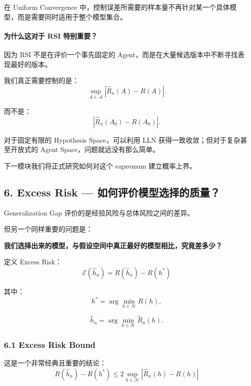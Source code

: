 在 Uniform Convergence 中，控制误差所需要的样本量不再针对某一个具体模型，而是需要同时适用于整个模型集合。

\hypertarget{part-2-12-0001-ux4e3aux4ec0ux4e48ux8fd9ux5bf9ux4e8e-rsi-ux7279ux522bux91cdux8981}{%
\paragraph{为什么这对于 RSI 特别重要？}\label{part-2-12-0001-ux4e3aux4ec0ux4e48ux8fd9ux5bf9ux4e8e-rsi-ux7279ux522bux91cdux8981}}

因为 RSI 不是在评价一个事先固定的 Agent，而是在大量候选版本中不断寻找表现最好的版本。

我们真正需要控制的是：
\[\sup_{A\in\mathcal A}
|\widehat R_n(A)-R(A)|.\]

而不是：
\[|\widehat R_n(A_0)-R(A_0)|.\]

对于固定有限的 Hypothesis Space，可以利用 LLN 获得一致收敛；但对于复杂甚至开放式的 Agent Space，问题就远没有那么简单。

下一模块我们将正式研究如何对这个 supremum 建立概率上界。

\hypertarget{part-2-12-0001-excess-risk-ux5982ux4f55ux8bc4ux4ef7ux6a21ux578bux9009ux62e9ux7684ux8d28ux91cf}{%
\subsection{6. Excess Risk --- 如何评价模型选择的质量？}\label{part-2-12-0001-excess-risk-ux5982ux4f55ux8bc4ux4ef7ux6a21ux578bux9009ux62e9ux7684ux8d28ux91cf}}

Generalization Gap 评价的是经验风险与总体风险之间的差异。

但另一个同样重要的问题是：

\textbf{我们选择出来的模型，与假设空间中真正最好的模型相比，究竟差多少？}

定义 Excess Risk：
\[\boxed{
\mathcal E(\hat h_n)
=
R(\hat h_n)-R(h^*)
}\]

其中：
\[h^*=\arg\min_{h\in\mathcal H}R(h),\]

\[\hat h_n=\arg\min_{h\in\mathcal H}\widehat R_n(h).\]

\hypertarget{part-2-12-0001-excess-risk-bound}{%
\subsubsection{6.1 Excess Risk Bound}\label{part-2-12-0001-excess-risk-bound}}

这是一个非常经典且重要的结论：
\[\boxed{
R(\hat h_n)-R(h^*)
\leq
2\sup_{h\in\mathcal H}
|\widehat R_n(h)-R(h)|
}\]

